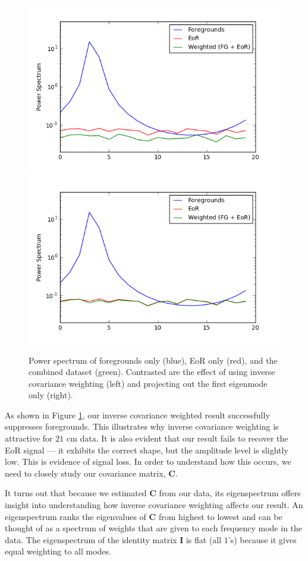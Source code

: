 \documentclass[preprint2,numberedappendix,tighten,twocolappendix]{aastex6}  %
\begin{document}
\begin{figure}
	\centering
	\includegraphics[trim={0.3cm 0.2cm 1cm 0.3cm},clip,height=0.3\textwidth]{plots/toy_sigloss3.png}
	\includegraphics[trim={1cm 0.2cm 0cm 0.3cm},clip,height=0.3\textwidth]{plots/toy_sigloss4.png}
	\caption{Power spectrum of foregrounds only (blue), EoR only (red), and the combined dataset (green). Contrasted are the effect of using inverse covariance weighting (left) and projecting out the first eigenmode only (right).}
	\label{fig:toy_sigloss3}
\end{figure}

As shown in Figure \ref{fig:toy_sigloss3}, our inverse covariance weighted result successfully suppresses foregrounds. This illustrates why inverse covariance weighting is attractive for $21$ cm data. It is also evident that our result fails to recover the EoR signal --- it exhibits the correct shape, but the amplitude level is slightly low. This is evidence of signal loss. In order to understand how this occurs, we need to closely study our covariance matrix, $\textbf{C}$.

It turns out that because we estimated $\textbf{C}$ from our data, its eigenspectrum offers insight into understanding how inverse covariance weighting affects our result. An eigenspectrum ranks the eigenvalues of $\textbf{C}$ from highest to lowest and can be thought of as a spectrum of weights that are given to each frequency mode in the data. The eigenspectrum of the identity matrix $\textbf{I}$ is flat (all $1$'s) because it gives equal weighting to all modes. 
\end{document}
